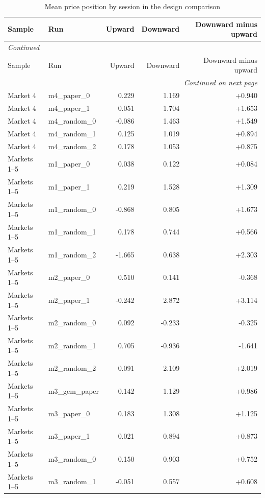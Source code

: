 \scriptsize
\begin{longtable}{p{3.0cm}p{2.7cm}rrr}
\caption{Mean price position by session in the design comparison}\label{tab:app-symmetric-sessions}\\
\toprule
Sample & Run & Upward & Downward & Downward minus upward \\
\midrule
\endfirsthead
\multicolumn{5}{l}{\textit{Continued}}\\
\toprule
Sample & Run & Upward & Downward & Downward minus upward \\
\midrule
\endhead
\midrule
\multicolumn{5}{r}{\textit{Continued on next page}}\\
\endfoot
\bottomrule
\endlastfoot
Market 4 & m4\_paper\_0 & 0.229 & 1.169 & +0.940 \\
Market 4 & m4\_paper\_1 & 0.051 & 1.704 & +1.653 \\
Market 4 & m4\_random\_0 & -0.086 & 1.463 & +1.549 \\
Market 4 & m4\_random\_1 & 0.125 & 1.019 & +0.894 \\
Market 4 & m4\_random\_2 & 0.178 & 1.053 & +0.875 \\
Markets 1--5 & m1\_paper\_0 & 0.038 & 0.122 & +0.084 \\
Markets 1--5 & m1\_paper\_1 & 0.219 & 1.528 & +1.309 \\
Markets 1--5 & m1\_random\_0 & -0.868 & 0.805 & +1.673 \\
Markets 1--5 & m1\_random\_1 & 0.178 & 0.744 & +0.566 \\
Markets 1--5 & m1\_random\_2 & -1.665 & 0.638 & +2.303 \\
Markets 1--5 & m2\_paper\_0 & 0.510 & 0.141 & -0.368 \\
Markets 1--5 & m2\_paper\_1 & -0.242 & 2.872 & +3.114 \\
Markets 1--5 & m2\_random\_0 & 0.092 & -0.233 & -0.325 \\
Markets 1--5 & m2\_random\_1 & 0.705 & -0.936 & -1.641 \\
Markets 1--5 & m2\_random\_2 & 0.091 & 2.109 & +2.019 \\
Markets 1--5 & m3\_gem\_paper & 0.142 & 1.129 & +0.986 \\
Markets 1--5 & m3\_paper\_0 & 0.183 & 1.308 & +1.125 \\
Markets 1--5 & m3\_paper\_1 & 0.021 & 0.894 & +0.873 \\
Markets 1--5 & m3\_random\_0 & 0.150 & 0.903 & +0.752 \\
Markets 1--5 & m3\_random\_1 & -0.051 & 0.557 & +0.608 \\

\end{longtable}
